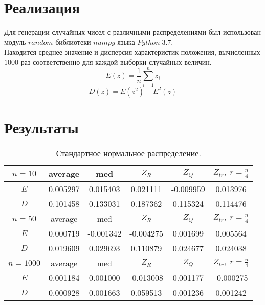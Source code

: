 \documentclass[a4]{article}
\begin{document}
	\section{Реализация}
	Для генерации случайных чисел с различными распределениями был использован модуль $random$ библиотеки $numpy$ языка $Python\;3.7$.\\
	Находится среднее значение и дисперсия характеристик положения, вычисленных $1000$ раз соответственно для каждой выборки случайных величин.  
	\begin{equation}
	E(z) = \frac{1}{n}\sum_{i=1}^n z_i
	\end{equation} 
	\begin{equation}
	D(z) = E\left(z^2\right) - E^2(z)
	\end{equation}
	
	\section{Результаты}
		\begin{table}[h]
			\caption{ Стандартное нормальное распределение.}
			\begin{center}
				\begin{tabular}{|c|c|c|c|c|c|}
					\hline
					$n = 10$ & average & med & $Z_R$ & $Z_Q$ & $Z_{tr},\;r=\frac{n}{4}$\\ \hline
					$E$      & 0.005297         & 0.015403         & 0.021111         & -0.009959        & 0.013976         \\ \hline
					$D$      & 0.101458         & 0.133031         & 0.187362         & 0.115324         & 0.114476         \\ \hline
					\hline
					$n = 50$ & average & med & $Z_R$ & $Z_Q$ & $Z_{tr},\;r=\frac{n}{4}$\\ \hline
					$E$      & 0.000719         & -0.001342        & -0.004275        & 0.001699         & 0.005564         \\ \hline
					$D$      & 0.019609         & 0.029693         & 0.110879         & 0.024677         & 0.024038         \\ \hline
					\hline
					$n =1000$ & average & med & $Z_R$ & $Z_Q$ & $Z_{tr},\;r=\frac{n}{4}$\\ \hline
					$E$      & 0.001184         & 0.001000         & -0.013008        & 0.001177         & -0.000275        \\ \hline
					$D$      & 0.000928         & 0.001663         & 0.059513         & 0.001236         & 0.001242         \\ \hline
				\end{tabular}
			\end{center}
		\end{table}
\end{document}
